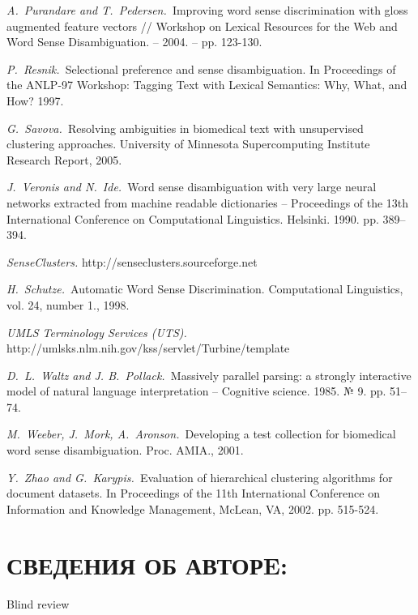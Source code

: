 \documentclass{article}
\begin{document}
\begin{articletext}
\begin{thebibliography}{9}
\textit{A.~Purandare and T.~Pedersen.~}Improving word sense discrimination with gloss augmented feature vectors // Workshop on Lexical Resources for the Web and Word Sense Disambiguation. – 2004. – pp. 123-130. 

\textit{P.~Resnik.~}Selectional preference and sense disambiguation. In Proceedings of the ANLP-97 Workshop: Tagging Text with Lexical Semantics: Why, What, and How? 1997.

\textit{G.~Savova.~}Resolving ambiguities in biomedical text with unsupervised clustering approaches. University of Minnesota Supercomputing Institute Research Report, 2005.

\textit{J.~Veronis and N.~Ide.~}Word  sense  disambiguation  with  very  large neural  networks  extracted  from machine readable dictionaries – Proceedings of the 13th International Conference on Computational Linguistics. Helsinki. 1990. pp. 389–394.

\textit{SenseClusters. } http://senseclusters.sourceforge.net

\textit{H.~Schutze.~}Automatic Word Sense Discrimination. Computational Linguistics, vol. 24, number 1., 1998.

\textit{UMLS Terminology Services (UTS).} http://umlsks.nlm.nih.gov/kss/servlet/Turbine/template

\textit{D.~L.~Waltz and J. B.~Pollack.~}Massively parallel parsing: a strongly interactive  model  of  natural  language interpretation – Cognitive science. 1985. № 9. pp. 51–74.

\textit{M.~Weeber, J.~Mork, A.~Aronson.~}Developing a test collection for biomedical word sense disambiguation. Proc. AMIA., 2001.

\textit{Y.~Zhao and G.~Karypis.~}Evaluation of hierarchical clustering algorithms for document datasets. In Proceedings of the 11th International Conference on Information and Knowledge Management, McLean, VA, 2002. pp. 515-524.



\end{thebibliography}
\end{articletext}


\section{СВЕДЕНИЯ ОБ АВТОРE:}

Blind review
\end{document}
